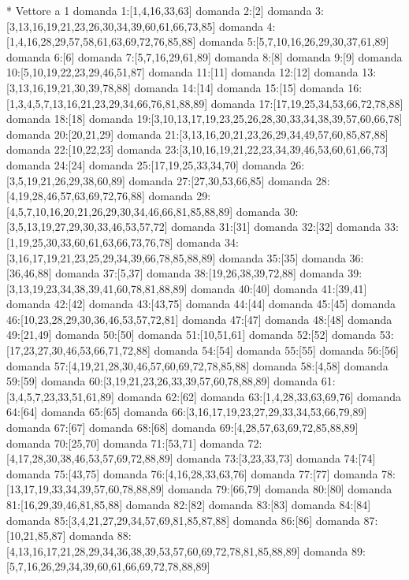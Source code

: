 * Vettore a 1
domanda 1:[1,4,16,33,63]
domanda 2:[2]
domanda 3:[3,13,16,19,21,23,26,30,34,39,60,61,66,73,85]
domanda 4:[1,4,16,28,29,57,58,61,63,69,72,76,85,88]
domanda 5:[5,7,10,16,26,29,30,37,61,89]
domanda 6:[6]
domanda 7:[5,7,16,29,61,89]
domanda 8:[8]
domanda 9:[9]
domanda 10:[5,10,19,22,23,29,46,51,87]
domanda 11:[11]
domanda 12:[12]
domanda 13:[3,13,16,19,21,30,39,78,88]
domanda 14:[14]
domanda 15:[15]
domanda 16:[1,3,4,5,7,13,16,21,23,29,34,66,76,81,88,89]
domanda 17:[17,19,25,34,53,66,72,78,88]
domanda 18:[18]
domanda 19:[3,10,13,17,19,23,25,26,28,30,33,34,38,39,57,60,66,78]
domanda 20:[20,21,29]
domanda 21:[3,13,16,20,21,23,26,29,34,49,57,60,85,87,88]
domanda 22:[10,22,23]
domanda 23:[3,10,16,19,21,22,23,34,39,46,53,60,61,66,73]
domanda 24:[24]
domanda 25:[17,19,25,33,34,70]
domanda 26:[3,5,19,21,26,29,38,60,89]
domanda 27:[27,30,53,66,85]
domanda 28:[4,19,28,46,57,63,69,72,76,88]
domanda 29:[4,5,7,10,16,20,21,26,29,30,34,46,66,81,85,88,89]
domanda 30:[3,5,13,19,27,29,30,33,46,53,57,72]
domanda 31:[31]
domanda 32:[32]
domanda 33:[1,19,25,30,33,60,61,63,66,73,76,78]
domanda 34:[3,16,17,19,21,23,25,29,34,39,66,78,85,88,89]
domanda 35:[35]
domanda 36:[36,46,88]
domanda 37:[5,37]
domanda 38:[19,26,38,39,72,88]
domanda 39:[3,13,19,23,34,38,39,41,60,78,81,88,89]
domanda 40:[40]
domanda 41:[39,41]
domanda 42:[42]
domanda 43:[43,75]
domanda 44:[44]
domanda 45:[45]
domanda 46:[10,23,28,29,30,36,46,53,57,72,81]
domanda 47:[47]
domanda 48:[48]
domanda 49:[21,49]
domanda 50:[50]
domanda 51:[10,51,61]
domanda 52:[52]
domanda 53:[17,23,27,30,46,53,66,71,72,88]
domanda 54:[54]
domanda 55:[55]
domanda 56:[56]
domanda 57:[4,19,21,28,30,46,57,60,69,72,78,85,88]
domanda 58:[4,58]
domanda 59:[59]
domanda 60:[3,19,21,23,26,33,39,57,60,78,88,89]
domanda 61:[3,4,5,7,23,33,51,61,89]
domanda 62:[62]
domanda 63:[1,4,28,33,63,69,76]
domanda 64:[64]
domanda 65:[65]
domanda 66:[3,16,17,19,23,27,29,33,34,53,66,79,89]
domanda 67:[67]
domanda 68:[68]
domanda 69:[4,28,57,63,69,72,85,88,89]
domanda 70:[25,70]
domanda 71:[53,71]
domanda 72:[4,17,28,30,38,46,53,57,69,72,88,89]
domanda 73:[3,23,33,73]
domanda 74:[74]
domanda 75:[43,75]
domanda 76:[4,16,28,33,63,76]
domanda 77:[77]
domanda 78:[13,17,19,33,34,39,57,60,78,88,89]
domanda 79:[66,79]
domanda 80:[80]
domanda 81:[16,29,39,46,81,85,88]
domanda 82:[82]
domanda 83:[83]
domanda 84:[84]
domanda 85:[3,4,21,27,29,34,57,69,81,85,87,88]
domanda 86:[86]
domanda 87:[10,21,85,87]
domanda 88:[4,13,16,17,21,28,29,34,36,38,39,53,57,60,69,72,78,81,85,88,89]
domanda 89:[5,7,16,26,29,34,39,60,61,66,69,72,78,88,89]


